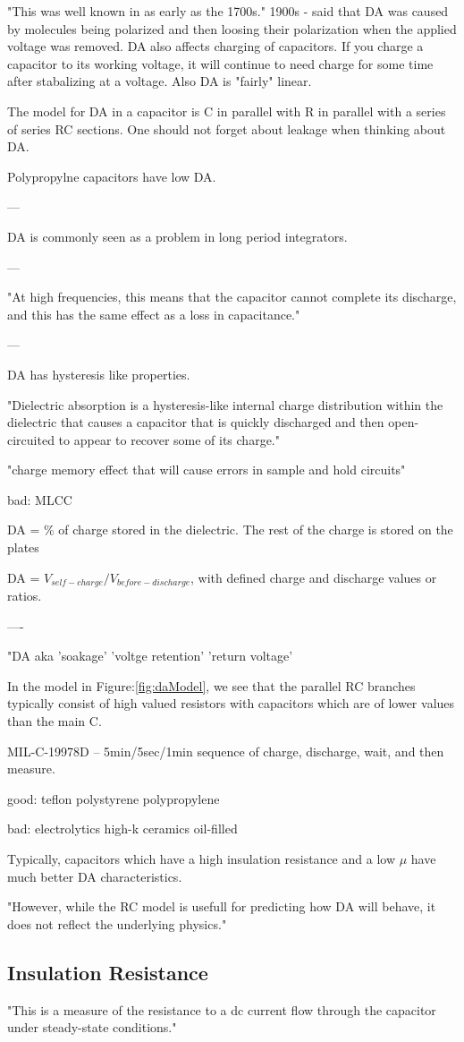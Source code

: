 "This was well known in as early as the 1700s." \cite{rap_da}
1900s - said that DA was caused by molecules being polarized and then loosing their polarization when the applied voltage was removed.
DA also affects charging of capacitors. If you charge a capacitor to its working voltage, it will continue to need charge for some time after stabalizing at a voltage. Also DA is "fairly" linear.

The model for DA in a capacitor is C in parallel with R in parallel with a series of series RC sections. One should not forget about leakage when thinking about DA.

Polypropylne capacitors have low DA.

---

DA is commonly seen as a problem in long period integrators. \cite{rap_da2}

---

"At high frequencies, this means that the capacitor cannot complete its discharge, and this has the same effect as a loss in capacitance."\cite{disc_comp}

---

DA has hysteresis like properties.

"Dielectric absorption is a hysteresis-like internal charge distribution within the dielectric that causes a capacitor that is quickly discharged and then open-circuited to appear to recover some of its charge."

"charge memory effect that will cause errors in sample and hold circuits"

bad:
MLCC

DA = \% of charge stored in the dielectric. The rest of the charge is stored on the plates

DA = $V_{self-charge} / V_{before-discharge}$, with defined charge and discharge values or ratios.
\cite[Sect.~3.6.7]{elec_inv}

----

"DA aka 'soakage' 'voltge retention' 'return voltage'

In the model in Figure:\ref{fig:daModel}, we see that the parallel RC branches typically consist of high valued resistors with capacitors which are of lower values than the main C.

MIL-C-19978D -- 5min/5sec/1min sequence of charge, discharge, wait, and then measure.

good:
teflon
polystyrene
polypropylene

bad:
electrolytics
high-k ceramics
oil-filled

Typically, capacitors which have a high insulation resistance and a low $\mu$ have much better DA characteristics.

"However, while the RC model is usefull for predicting how DA will behave, it does not reflect the underlying physics."
\cite{capSite_intro}

\subsection{Insulation Resistance}
"This is a measure of the resistance to a dc current flow through the capacitor under steady-state conditions."\cite[Sect.~3.6.7]{elec_inv}
